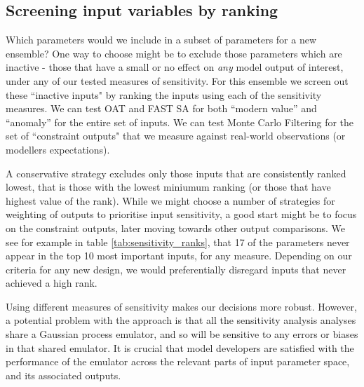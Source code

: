 \documentclass[gmd, manuscript]{copernicus}
\begin{document}
\subsection{Screening input variables by  ranking}\label{ssec:sa_ranking}

Which parameters would we include in a subset of parameters for a new ensemble?  One way to choose might be to exclude those parameters which are inactive - those that have a small or no effect on \emph{any} model output of interest, under any of our tested measures of sensitivity. For this ensemble we screen out these ``inactive inputs" by ranking the inputs using each of the sensitivity measures. We can test OAT and FAST SA for both ``modern value'' and ``anomaly'' for the entire set of inputs. We can test Monte Carlo Filtering for the set of ``constraint outputs" that we measure against real-world observations (or modellers expectations).

A conservative strategy excludes only those inputs that are consistently ranked lowest, that is those with the lowest miniumum ranking (or those that have highest value of the rank). While we might choose a number of strategies for weighting of outputs to prioritise input sensitivity, a good start might be to focus on the constraint outputs, later moving towards other output comparisons. We see for example in table \ref{tab:sensitivity_ranks}, that 17 of the parameters never appear in the top 10 most important inputs, for any measure. Depending on our criteria for any new design, we would preferentially disregard inputs that never achieved a high rank.

Using different measures of sensitivity makes our decisions more robust. However, a potential problem with the approach is that all the sensitivity analysis analyses share a Gaussian process emulator, and so will be sensitive to any errors or biases in that shared emulator. It is crucial that model developers are satisfied with the performance of the emulator across the relevant parts of input parameter space, and its associated outputs.
\end{document}
